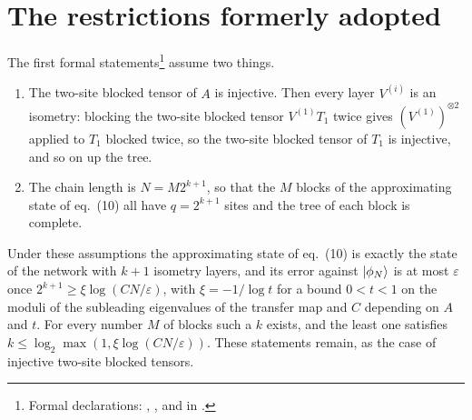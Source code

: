 \documentclass{article}
\begin{document}
\section{The restrictions formerly adopted}
The first formal statements\footnote{Formal declarations:
    ,
    , and
    in .}
assume two things.
\begin{enumerate}
    \item The two-site blocked tensor of $A$ is injective. Then every layer
          $V^{(i)}$ is an isometry: blocking the two-site blocked tensor
          $V^{(1)}T_1$ twice gives $(V^{(1)})^{\otimes2}$ applied to $T_1$
          blocked twice, so the two-site blocked tensor of $T_1$ is injective,
          and so on up the tree.
    \item The chain length is $N=M2^{k+1}$, so that the $M$ blocks of the
          approximating state of eq.~(10) all have $q=2^{k+1}$ sites and the
          tree of each block is complete.
\end{enumerate}
Under these assumptions the approximating state of eq.~(10) is exactly the state
of the network with $k+1$ isometry layers, and its error against $|\phi_N\rangle$
is at most $\varepsilon$ once $2^{k+1}\ge\xi\log(CN/\varepsilon)$, with
$\xi=-1/\log t$ for a bound $0<t<1$ on the moduli of the subleading
eigenvalues of the transfer map and $C$ depending on $A$ and $t$. For every
number $M$ of blocks such a $k$ exists, and the least one satisfies
$k\le\log_2\max(1,\xi\log(CN/\varepsilon))$. These statements remain, as
the case of injective two-site blocked tensors.
\end{document}
